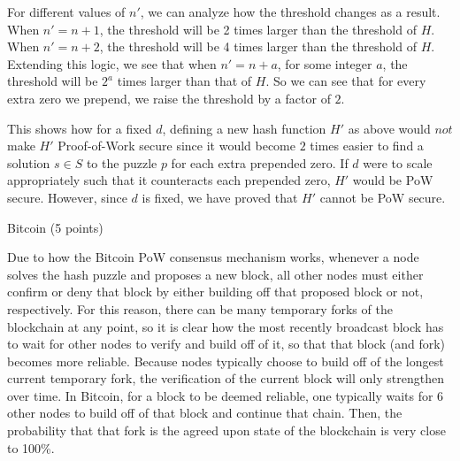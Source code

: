 \documentclass[12pt]{article}
\newenvironment{question}[2][Question]{\begin{trivlist}
\item[\hskip \labelsep {\bfseries #1}\hskip \labelsep {\bfseries #2.}]}{\end{trivlist}}
\begin{document}
For different values of $n'$, we can analyze how the threshold changes as a result. When $n'=n+1$, the threshold will be 2 times larger than the threshold of $H$. When $n'=n+2$, the threshold will be 4 times larger than the threshold of $H$. Extending this logic, we see that when $n'=n+a$, for some integer $a$, the threshold will be $2^a$ times larger than that of $H$. So we can see that for every extra zero we prepend, we raise the threshold by a factor of $2$.

This shows how for a fixed $d$, defining a new hash function $H'$ as above would $\textit{not}$ make $H'$ Proof-of-Work secure since it would become $2$ times easier to find a solution $s \in S$ to the puzzle $p$ for each extra prepended zero. If $d$ were to scale appropriately such that it counteracts each prepended zero, $H'$ would be PoW secure. However, since $d$ is fixed, we have proved that $H'$ cannot be PoW secure.

















\begin{question}{5}{Bitcoin (5 points)} %
\end{question}

Due to how the Bitcoin PoW consensus mechanism works, whenever a node solves the hash puzzle and proposes a new block, all other nodes must either confirm or deny that block by either building off that proposed block or not, respectively. For this reason, there can be many temporary forks of the blockchain at any point, so it is clear how the most recently broadcast block has to wait for other nodes to verify and build off of it, so that that block (and fork) becomes more reliable. Because nodes typically choose to build off of the longest current temporary fork, the verification of the current block will only strengthen over time. In Bitcoin, for a block to be deemed reliable, one typically waits for 6 other nodes to build off of that block and continue that chain. Then, the probability that that fork is the agreed upon state of the blockchain is very close to 100\%.



 
 
\end{document}
